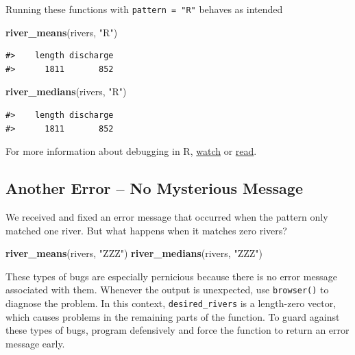 \documentclass[
]{book}
\newenvironment{Shaded}{\begin{snugshade}}{\end{snugshade}}
\newcommand{\KeywordTok}[1]{\textcolor[rgb]{0.13,0.29,0.53}{\textbf{#1}}}
\newcommand{\NormalTok}[1]{#1}
\newcommand{\StringTok}[1]{\textcolor[rgb]{0.31,0.60,0.02}{#1}}
\begin{document}
Running these functions with \texttt{pattern\ =\ "R"} behaves as intended

\begin{Shaded}
\begin{Highlighting}[]
\KeywordTok{river_means}\NormalTok{(rivers, }\StringTok{"R"}\NormalTok{)}
\end{Highlighting}
\end{Shaded}

\begin{verbatim}
#>    length discharge 
#>      1811       852
\end{verbatim}

\begin{Shaded}
\begin{Highlighting}[]
\KeywordTok{river_medians}\NormalTok{(rivers, }\StringTok{"R"}\NormalTok{)}
\end{Highlighting}
\end{Shaded}

\begin{verbatim}
#>    length discharge 
#>      1811       852
\end{verbatim}

For more information about debugging in R, \href{https://www.youtube.com/watch?v=vgYS-F8opgE}{watch} or \href{https://adv-r.hadley.nz/debugging.html}{read}.

\hypertarget{another-error-no-mysterious-message}{%
\subsection{Another Error -- No Mysterious Message}\label{another-error-no-mysterious-message}}

We received and fixed an error message that occurred when the pattern only matched one river. But what happens when it matches zero rivers?

\begin{Shaded}
\begin{Highlighting}[]
\KeywordTok{river_means}\NormalTok{(rivers, }\StringTok{"ZZZ"}\NormalTok{)}
\KeywordTok{river_medians}\NormalTok{(rivers, }\StringTok{"ZZZ"}\NormalTok{)}
\end{Highlighting}
\end{Shaded}

These types of bugs are especially pernicious because there is no error message associated with them. Whenever the output is unexpected, use \texttt{browser()} to diagnose the problem. In this context, \texttt{desired\_rivers} is a length-zero vector, which causes problems in the remaining parts of the function. To guard against these types of bugs, program defensively and force the function to return an error message early.
\end{document}
